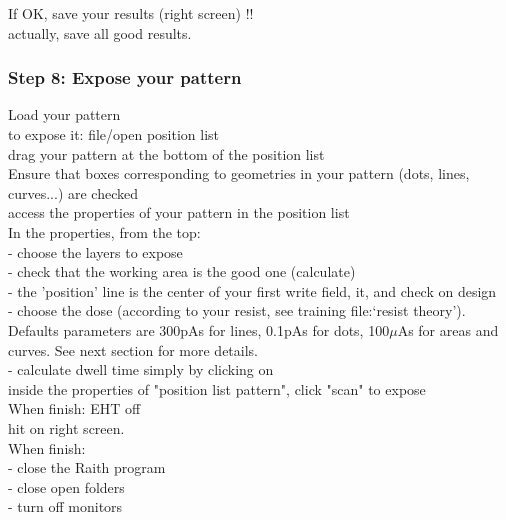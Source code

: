 If OK, save your results (right screen) !!\\
actually, save all good results.\\



\subsubsection{Step 8: Expose your pattern}

Load your pattern\\

to expose it: file/open position list\\

drag your pattern at the bottom of the position list \\

Ensure that boxes corresponding to geometries in your pattern (dots, lines, curves...) are checked\\

access the properties of your pattern in the position list\\

In the properties, from the top:\\
- choose the layers to expose\\
- check that the working area is the good one (calculate)\\
- the 'position' line is the center of your first write field,  it, and check on design \\
- choose the dose (according to your resist, see training file:`resist theory'). Defaults parameters are 300pAs for lines, 0.1pAs for dots, 100$\mu$As for areas and curves. See next section for more details. \\
- calculate dwell time simply by clicking on \\

inside the properties of "position list pattern", click "scan" to expose\\

When finish: EHT off\\

hit  on right screen.\\

When finish:\\
- close the Raith program\\
- close open folders\\
- turn off monitors\\


